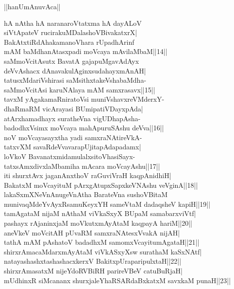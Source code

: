 \documentclass{article}
\begin{document}
\begin{center}
||hanUmAnuvAca||
\end{center}

hA nAtha hA naranaroVtatxma hA dayALoV\\
siVtApateV rucirakuMDalashoVBivakatxrX|\\
BakAtxtiRdAhakamanoVhara rUpadhArinf\\
mAM baMdhanAtasxpadi moVcaya mAvilaMbaM||14||\\
saMmoVcitAsutx BavatA gajapuMgavAdAyx\\
deVvAshacx dAnavakulAginxsudahayxmAnAH|\\
tatusxMdariVshirasi saMsithxtakeVshabaMdha-\\
saMmoVcitAsi karuNAlaya mAM samxrasavx||15||\\
tavxM yAgakamaRniratoVsi muniVshavxreVMderxY-\\
dhaRmaRM vicArayasi BUmipatiVDayxpAda|\\
atArxhamadhayx suratheVna vigUDhapAsha-\\
badodhxVsimx moVcaya mahApuruSAshu deVva||16||\\
noV moVcayasayxtha yadi samxraNAtireVkA-\\
tatxvXM savaRdeVvavarapUjitapAdapadamx|\\
loVkoV BavanatxmidamulalxsitoVhasiSayx-\\
tatxsAmxdivxlaMbamiha mAcara moVcayAshu||17||\\
iti shurxtAvx jaganAnxthoV raGuviVraH kaqpAnidhiH|\\
BakatxM moVcayituM pArxgAtupxSapxkeVNAshu veVginA||18||\\
lakaSxmXNeVnAnugeVnAtha BarateVna sushoVBitaM\\
munivaqMdeYvAyxRsamuKeyxYH sameVtaM dadaqsheV kapiH||19||\\
tamAgataM nijaM nAthaM viVkaSxyX BUpaM samabarxviVtf|\\
pashayx rAjaninxjaM moVkutxmAyAtaM kaqpayA hariM||20||\\
aneVkeV moVcitAH pUvaRM samxraNAtesxVvakA nijAH|\\
tathA mAM pAshatoV badadhxM samomxVcayitumAgataH||21||\\
shirxrAmacaMdarxmAyAtaM viVkASxyXsw surathaM kaSxNAtf|\\
natayashashxtashashacxkerxV BakitxpUraparipulxtaH||22||\\
shirxrAmasatxM nijeYdoRVBiRH parireVBeV catuBuRjaH|\\
mUdhinxR siMcananx shurxjaleYhaRSARdaBxkatxM savxkaM punaH||23||\\
\end{document}
